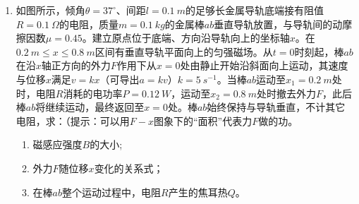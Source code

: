 \begin{enumerate}
\newpage
\item 
{}
如图所示，倾角$ \theta =37 ^{\circ} $、间距$ l = 0.1\ m $的足够长金属导轨底端接有阻值$ R=0.1\ \Omega $的电阻，质量$ m=0.1 \ kg $的金属棒$ ab $垂直导轨放置，与导轨间的动摩擦因数$ \mu =0.45 $。建立原点位于底端、方向沿导轨向上的坐标轴$ x $。在$ 0.2\ m \leq x \leq 0.8\ m $区间有垂直导轨平面向上的匀强磁场。从$ t=0 $时刻起，棒$ ab $在沿$ x $轴正方向的外力$ F $作用下从$ x=0 $处由静止开始沿斜面向上运动，其速度与位移$ x $满足$ v=kx $（可导出$ a=kv $）$ k=5 \ s^{-1} $。当棒$ ab $运动至$ x_1=0.2\ m $处时，电阻$ R $消耗的电功率$ P=0.12 \ W $，运动至$ x_2=0.8\ m $处时撤去外力$ F $，此后棒$ ab $将继续运动，最终返回至$ x=0 $处。棒$ ab $始终保持与导轨垂直，不计其它电阻，求：（提示：可以用$ F - x $图象下的“面积”代表力$ F $做的功。
\begin{enumerate}
\renewcommand{\labelenumi}{\arabic{enumi}.}
\item
磁感应强度$ B $的大小;
\item 
外力$ F $随位移$ x $变化的关系式；
\item 
在棒$ ab $整个运动过程中，电阻$ R $产生的焦耳热$ Q $。



\end{enumerate}
\begin{figure}[h!]
\flushright 

\end{figure}









\end{enumerate}	




